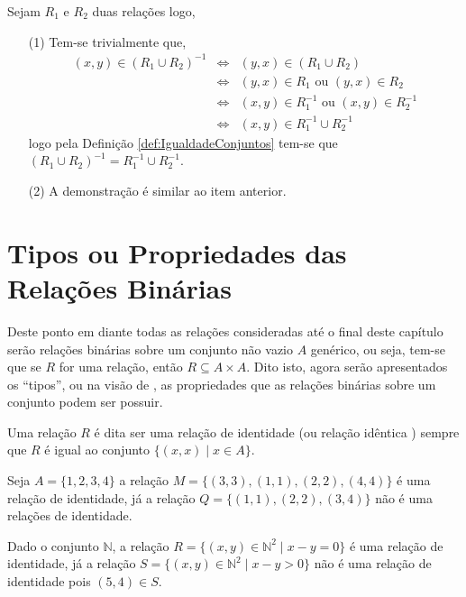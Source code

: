 \begin{prova}
	Sejam $R_1$ e $R_2$ duas relações logo,
	\begin{itemize}
		\item[(1)] Tem-se trivialmente que,  
      \begin{eqnarray*}
        (x, y) \in (R_1 \cup R_2)^{-1} & \Longleftrightarrow &  (y, x) \in (R_1 \cup R_2)\\
        & \Longleftrightarrow & (y, x) \in R_1 \text{ ou } (y, x) \in R_2\\
        & \Longleftrightarrow & (x, y) \in R_1^{-1} \text{ ou } (x, y) \in R_2^{-1}\\
        & \Longleftrightarrow & (x, y) \in R_1^{-1} \cup R_2^{-1}
      \end{eqnarray*}
      logo pela Definição \ref{def:IgualdadeConjuntos} tem-se que $(R_1 \cup R_2)^{-1} = R_1^{-1} \cup R_2^{-1}$.
		\item[(2)] A demonstração é similar ao item anterior.
	\end{itemize}
\end{prova}

\section{Tipos ou Propriedades das Relações Binárias}\label{sec:TipoDasRelacoesBinarias}

Deste ponto em diante todas as relações consideradas até o final deste capítulo serão relações binárias sobre um conjunto não vazio $A$ genérico, ou seja, tem-se que se $R$ for uma relação, então $R \subseteq A \times A$. Dito isto, agora serão apresentados os ``tipos'', ou na visão de \cite{abe1991-TC}, as propriedades que as relações binárias sobre um conjunto podem ser possuir.

\begin{definicao}\label{def:RelacaoIdentica}
	Uma relação $R$ é dita ser uma relação de identidade (ou relação idêntica \cite{abe1991-TC}) sempre que $R$ é igual ao conjunto $\{(x, x) \mid x \in A\}$.
\end{definicao}

\begin{exemplo}
	Seja $A = \{1, 2, 3, 4\}$ a relação $M = \{(3, 3), (1, 1), (2,2), (4,4)\}$ é uma relação de identidade, já a relação $Q = \{(1, 1), (2,2), (3,4)\}$ não é uma relações de identidade.
\end{exemplo}

\begin{exemplo}
	Dado o conjunto $\mathbb{N}$, a relação $R = \{(x, y) \in \mathbb{N}^2 \mid x - y = 0\}$ é uma relação de identidade, já a relação $S =  \{(x, y) \in \mathbb{N}^2 \mid x - y > 0\}$ não é uma relação de identidade pois $(5, 4) \in S$.
\end{exemplo}

